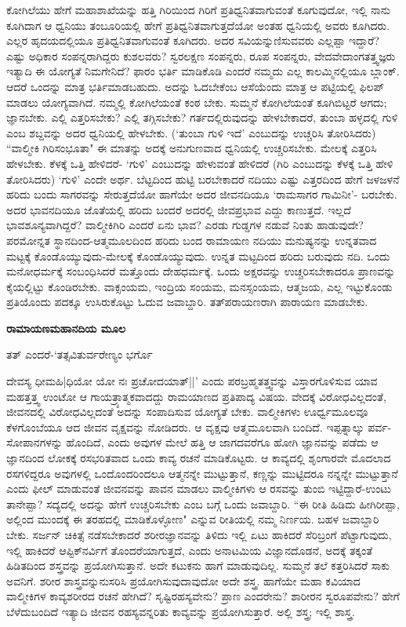 ಕೋಗಿಲೆಯು ಹೇಗೆ ಮಹಾಶಾಖೆಯನ್ನು ಹತ್ತಿ ಗಿರಿಯಿಂದ ಗಿರಿಗೆ ಪ್ರತಿಧ್ವನಿತವಾಗುವಂತೆ ಕೂಗುವುದೋ, ಇಲ್ಲಿ ನಾನು ಕೂಗಿದಾಗ ಆ ಧ್ವನಿಯು ತಂಬೂರಿಯಲ್ಲಿ ಹೇಗೆ ಪ್ರತಿಧ್ವನಿತವಾಗುತ್ತದೆಯೋ ಅಂತಹ ಧ್ವನಿಯಲ್ಲಿ ಅವರು ಕೂಗಿದರು. ಎಲ್ಲರ ಹೃದಯದಲ್ಲಿಯೂ ಪ್ರತಿಧ್ವನಿತವಾಗುವಂತೆ ಕೂಗಿದರು. ಅದರ ಸವಿಯನ್ನುಣಿಸುವವರು ಎಲ್ಲಪ್ಪಾ ಇದ್ದಾರೆ? ಎಷ್ಟು ಅಧಿಕಾರ ಸಂಪನ್ನರಾಗಿದ್ದರು ಕುಶಲವರು? ಸ್ವರಲಕ್ಷಣ ಸಂಪನ್ನರು, ರೂಪ ಸಂಪನ್ನರು, ವೇದವೇದಾಂಗತತ್ತ್ವಜ್ಞರು ಇತ್ಯಾದಿ ಈ ಯೋಗ್ಯತೆ ನಿಮಗೇನಿದೆ? ಫಾರಂ ಭರ್ತಿ ಮಾಡಿಕೊಡಿ ಎಂದರೆ ನಮ್ಮದು ಎಲ್ಲ ಕಾಲಮ್ಮಿನಲ್ಲಿಯೂ ಬ್ಲಾಂಕ್‍. ಆದರೆ ಒಂದನ್ನು ಮಾತ್ರ ಭರ್ತಿಮಾಡಬಹುದು. ಅದನ್ನು ಓದಬೇಕೆಂಬ ಆಸೆಯೆಂದು ಮಾತ್ರ ಆ ಪಟ್ಟಿಯಲ್ಲಿ ಫಿಲಪ್‍ ಮಾಡಲು ಯೋಗ್ಯವಾಗಿದೆ. ನಮ್ಮಲ್ಲಿ ಕೋಗಿಲೆಯಂತೆ ಕಂಠ ಬೇಕು. ಸುಮ್ಮನೆ ಕೋಗಿಲೆಯಂತೆ ಕೂಗಿಬಿಟ್ಟರೆ ಆಗದು; ಜ್ಞಾನಬೇಕು. ಎಲ್ಲಿ ಎತ್ತರಿಸಬೇಕು? ಎಲ್ಲಿ ತಗ್ಗಿಸಬೇಕು? ಗರ್ತದಲ್ಲಿರುವುದನ್ನು ಹೇಳಬೇಕಾದರೆ, ತುಂಬಾ ಹಳ್ಳದಲ್ಲಿ ಗುಳಿ ಎಂಬ ಶಬ್ದವನ್ನು ಅದರ ಧ್ವನಿಯಲ್ಲಿ ಹೇಳಬೇಕು. (`ತುಂಬಾ ಗುಳಿ ಇದೆ' ಎಂಬುದನ್ನು ಉಚ್ಚರಿಸಿ ತೋರಿಸಿದರು) ``ವಾಲ್ಮೀಕಿ ಗಿರಿಸಂಭೂತಾ" ಈ ಮಾತನ್ನು ಅದಕ್ಕೆ ಅನುಗುಣವಾದ ಧ್ವನಿಯಲ್ಲಿ ಉಚ್ಚರಿಸಬೇಕು. ಮೇಲಕ್ಕೆ ಎತ್ತರಿಸಿ ಹೇಳಬೇಕು. ಕೆಳಕ್ಕೆ ಒತ್ತಿ ಹೇಳಿದರೆ- `ಗುಳಿ' ಎಂಬುದನ್ನು ಹೇಳುವಂತೆ ಹೇಳಿದರೆ (ಗಿರಿ ಎಂಬುದನ್ನು ಕೆಳಕ್ಕೆ ಒತ್ತಿ ಹೇಳಿ ತೋರಿಸಿದರು) `ಗುಳಿ' ಎಂದೇ ಅರ್ಥ. ಬೆಟ್ಟದಿಂದ ಹುಟ್ಟಿ ಬರಬೇಕಾದರೆ ನದಿಯು ಎಷ್ಟು ಎತ್ತರದಿಂದ ಹೇಗೆ ಜಳಜಳನೆ ಹರಿದು ಬಂದು ಸಾಗರವನ್ನು ಸೇರುತ್ತದೆಯೋ ಹಾಗೆಯೇ ಅದರ ಜೀವನದಿಯೂ `ರಾಮಸಾಗರ ಗಾಮಿನೀ'- ಬರಬೇಕು. ಅದರ ಭಾವನದಿಯೂ ಜೊತೆಯಲ್ಲಿ ಹರಿದು ಬಂದರೆ ಅದರಲ್ಲಿ ಜೀವಪ್ರಭಾವ ಎದ್ದು ಕಾಣುತ್ತದೆ. ಇಲ್ಲದೆ ಭಾವಶೂನ್ಯವಾಗಿದ್ದರೆ? ವಾಲ್ಮೀಕಿಗಿರಿ ಎಂದರೆ ಏನು ಭಾವ? ಎರಡು ಗುಡ್ಡಗಳ ನಡುವೆ ನಿಂತು ಹಾಡುವುದೇ? ಪರಮೋನ್ನತ ಸ್ಥಾನದಿಂದ-ಆತ್ಮಮೂಲದಿಂದ ಹರಿದು ಬಂದ ರಾಮಾಯಣ ನದಿಯು ಮನುಷ್ಯನನ್ನು ಉನ್ನತವಾದ ಮಟ್ಟಕ್ಕೆ ಕೊಂಡೊಯ್ಯುವುದು-ಮೇಲಕ್ಕೆ ಕೊಂಡೊಯ್ಯುವುದು. ಉನ್ನತ ಮಟ್ಟದಿಂದ ಹರಿದು ಬರುವುದು ನದಿ. ಒಂದು ಮನೋಧರ್ಮಕ್ಕೆ ಸಂಬಂಧಿಸಿದರೆ ಮತ್ತೊಂದು ದೇಹಧರ್ಮಕ್ಕೆ. ಒಂದು ಅಕ್ಷರವನ್ನು ಉಚ್ಚರಿಸಬೇಕಾದರೂ ಪ್ರಾಣವನ್ನು ಕೈಯಲ್ಲಿಟ್ಟು ಕೊಂಡಿರಬೇಕು. ವಾಕ್ಸಂಯಮ, ಇಂದ್ರಿಯ ಸಂಯಮ, ಮನಸ್ಸಂಯಮ, ಆತ್ಮಜಯ, ಎಲ್ಲ ಇಟ್ಟುಕೊಂಡು ಪ್ರತಿಯೊಂದು ಪದಕ್ಕೂ ಉಸಿರುಕೊಟ್ಟು ಓದುವ ಜವಾಬ್ದಾರಿ. ತತ್‍ಪರಾಯಣರಾಗಿ ಪಾರಾಯಣ ಮಾಡಬೇಕು. 


{\bf ರಾಮಾಯಣಮಹಾನದಿಯ ಮೂಲ} 


ತತ್‍ ಎಂದರೆ-`ತತ್ಸವಿತುರ್ವರೇಣ್ಯಂ ಭರ್ಗೊ

ದೇವಸ್ಯ ಧೀಮಹಿ|ಧಿಯೋ ಯೋ ನಃ ಪ್ರಚೋದಯಾತ್‍||' ಎಂದು ಪರಬ್ರಹ್ಮತತ್ತ್ವವನ್ನು ವಿಸ್ತಾರಗೊಳಿಸುವ ಯಾವ ಮಹತ್ತತ್ತ್ವ ಉಂಟೋ ಆ ಗಾಯತ್ರ್ಯಾತ್ಮಕವಾದದ್ದು ರಾಮಯಾಣದ ಪ್ರತಿಪಾದ್ಯ ವಿಷಯ. ವೇದಕ್ಕೆ ವಿರೋಧವಿಲ್ಲದಂತೆ, ಜೀವನದಲ್ಲಿ ವಿರೋಧವಿಲ್ಲದಂತೆ ಅದನ್ನು ಸಂಪಾದಿಸುವ ಯೋಗ್ಯತೆ ಬೇಕು. ವಾಲ್ಮೀಕಿಗಳು ಊರ್ಧ್ವಮೂಲವೂ ಕೆಳಗೊಂಬೆಯೂ ಆದ ಜೀವನ ವೃಕ್ಷವನ್ನು ನೋಡಿದರು. ಆ ವೃಕ್ಷವು ಆತ್ಮಮೂಲವಾಗಿ ಬಂದಿದೆ. ಇಪ್ಪತ್ನಾಲ್ಕು ಪರ್ವ-ಸೋಪಾನಗಳನ್ನು ಹೊಂದಿದೆ, ಎಂದು ಅವುಗಳ ಮೇಲೆ ಹತ್ತಿ ಆ ಜಾಗದವರೆಗೂ ಹೋಗಿ ಜ್ಞಾನವನ್ನು ಪಡೆದು ಆ ಜ್ಞಾನದಿಂದ ಲೋಕಕ್ಕೆ ರಸಭರಿತವಾದ ಒಂದು ಕಾವ್ಯ ರಚನೆ ಮಾಡಿಕೊಟ್ಟರು. ಆ ಕಾವ್ಯದಲ್ಲಿ ಶೃಂಗಾರವೇ ಮೊದಲಾದ ರಸಗಳಿದ್ದರೂ ಅವುಗಳಲ್ಲಿ ಒಂದೊಂದರಿಂದಲೂ ಆತ್ಮನನ್ನೇ ಮುಟ್ಟುತ್ತಾನೆ, ಕಣ್ಣನ್ನು ಮುಟ್ಟಿದರೂ ನನ್ನನ್ನೇ ಮುಟ್ಟುತ್ತಾನೆ ಎಂದು ಫೀಲ್‍ ಮಾಡುವಂತೆ ಜೀವನವನ್ನು ಪಾವನ ಮಾಡಲು ವಾಲ್ಮೀಕಿಗಳು ಆ ರಸವನ್ನು ತುಂಬಿ ಇಟ್ಟಿದ್ದಾರೆ-ಉಂಟು ತಾನೇಪ್ಪಾ? ಸದ್ಯದಲ್ಲಿ ಅದನ್ನು ಹೇಗೆ ಉಚ್ಚರಿಸಬೇಕು ಎಂಬ ಬಗ್ಗೆ ಒಂದು ಜವಾಬ್ದಾರಿ. ``ಈ ರೀತಿ ಹಿಡಿದು ಹೀಗಿರೀಪ್ಪಾ, ಅಲ್ಲಿಂದ ಮುಂದಕ್ಕೆ ಈ ತರಹದಲ್ಲಿ ಮಾಡಿಕೊಳ್ಳೋಣ" ಎನ್ನುವ ರೀತಿಯಲ್ಲಿ ನಮ್ಮ ನಿರ್ಣಯ. ಬಹಳ ಜವಾಬ್ದಾರಿ ಬೇಕು. ಸರ್ಜನ್‍ ಚಿಕಿತ್ಸೆ ನಡೆಸಬೇಕಾದರೆ ಶರೀರಜ್ಞಾನವನ್ನು ತಿಳಿದು ಇಲ್ಲಿ ಏಟು ಹಾಕಿದರೆ ಸೆರಿಬ್ರಂಗೆ ಪೆಟ್ಟಾಗುವುದು, ಇಲ್ಲಿ ಹಾಕಿದರೆ ಆಪ್ಟಿಕ್‍ನರ್ವಿಗೆ ತೊಂದರೆಯಾಗುತ್ತದೆ, ಎಂದು ಅನಾಟಮಿಯ ವಿಜ್ಞಾನದೊಡನೆ, ಅದಕ್ಕೆ ತಕ್ಕಂತೆ ಹಿಡಿತದಿಂದ ಶಸ್ತ್ರವನ್ನು ಪ್ರಯೋಗಿಸುತ್ತಾನೆ. ಅದೇ ಕಟುಕನು ಹಾಗೆ ಮಾಡುವುದಿಲ್ಲ. ಸುಮ್ಮನೆ ತಲೆ ಕತ್ತರಿಸಿದರೆ ಸಾಕು ಅವನಿಗೆ. ಶರೀರ ಶಾಸ್ತ್ರವನ್ನುನುಸರಿಸಿ ಪ್ರಯೋಗಿಸುವುದಾವುದೋ ಅದೇ ಶಸ್ತ್ರ. ಹಾಗೆಯೇ ಮಹಾ ಕವಿಯಾದ ವಾಲ್ಮೀಕಿಗಳ ಕಾವ್ಯಶರೀರದ ರಚನೆ ಹೇಗಿದೆ? ಸೃಷ್ಟಿರಹಸ್ಯವೇನು? ಪ್ರಾಣ ಎಂದರೇನು? ಶಾರೀರನ ಸ್ವರೂಪವೇನು? ಹೇಗೆ ಬೆಳೆದುಬಂದಿದೆ ಇತ್ಯಾದಿ ಜೀವನ ರಹಸ್ಯವನ್ನರಿತು ಕಾವ್ಯವನ್ನು ಪ್ರಯೋಗಿಸುತ್ತಾರೆ. ಅಲ್ಲಿ ಶಸ್ತ್ರ; ಇಲ್ಲಿ ಶಾಸ್ತ್ರ. 


